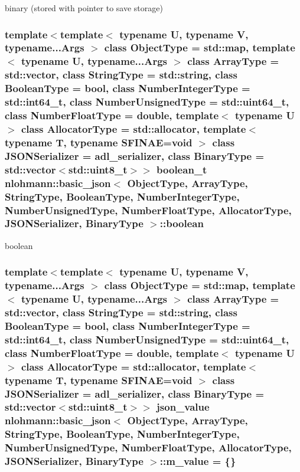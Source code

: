 binary (stored with pointer to save storage) 

\subsubsection[{\texorpdfstring{boolean}{boolean}}]{\setlength{\rightskip}{0pt plus 5cm}template$<$template$<$ typename U, typename V, typename...\+Args $>$ class Object\+Type = std\+::map, template$<$ typename U, typename...\+Args $>$ class Array\+Type = std\+::vector, class String\+Type  = std\+::string, class Boolean\+Type  = bool, class Number\+Integer\+Type  = std\+::int64\+\_\+t, class Number\+Unsigned\+Type  = std\+::uint64\+\_\+t, class Number\+Float\+Type  = double, template$<$ typename U $>$ class Allocator\+Type = std\+::allocator, template$<$ typename T, typename S\+F\+I\+N\+A\+E=void $>$ class J\+S\+O\+N\+Serializer = adl\+\_\+serializer, class Binary\+Type  = std\+::vector$<$std\+::uint8\+\_\+t$>$$>$ {\bf boolean\+\_\+t} {\bf nlohmann\+::basic\+\_\+json}$<$ Object\+Type, Array\+Type, String\+Type, Boolean\+Type, Number\+Integer\+Type, Number\+Unsigned\+Type, Number\+Float\+Type, Allocator\+Type, J\+S\+O\+N\+Serializer, Binary\+Type $>$\+::boolean\hspace{0.3cm}{\ttfamily [private]}}\hypertarget{classnlohmann_1_1basic__json_a7386443608348fa4b451f033a1439074}{}\label{classnlohmann_1_1basic__json_a7386443608348fa4b451f033a1439074}


boolean 

\subsubsection[{\texorpdfstring{m\+\_\+value}{m_value}}]{\setlength{\rightskip}{0pt plus 5cm}template$<$template$<$ typename U, typename V, typename...\+Args $>$ class Object\+Type = std\+::map, template$<$ typename U, typename...\+Args $>$ class Array\+Type = std\+::vector, class String\+Type  = std\+::string, class Boolean\+Type  = bool, class Number\+Integer\+Type  = std\+::int64\+\_\+t, class Number\+Unsigned\+Type  = std\+::uint64\+\_\+t, class Number\+Float\+Type  = double, template$<$ typename U $>$ class Allocator\+Type = std\+::allocator, template$<$ typename T, typename S\+F\+I\+N\+A\+E=void $>$ class J\+S\+O\+N\+Serializer = adl\+\_\+serializer, class Binary\+Type  = std\+::vector$<$std\+::uint8\+\_\+t$>$$>$ {\bf json\+\_\+value} {\bf nlohmann\+::basic\+\_\+json}$<$ Object\+Type, Array\+Type, String\+Type, Boolean\+Type, Number\+Integer\+Type, Number\+Unsigned\+Type, Number\+Float\+Type, Allocator\+Type, J\+S\+O\+N\+Serializer, Binary\+Type $>$\+::m\+\_\+value = \{\}}\hypertarget{classnlohmann_1_1basic__json_a72f1c0ede41f166429ce3fe7c2ffefc0}{}\label{classnlohmann_1_1basic__json_a72f1c0ede41f166429ce3fe7c2ffefc0}


